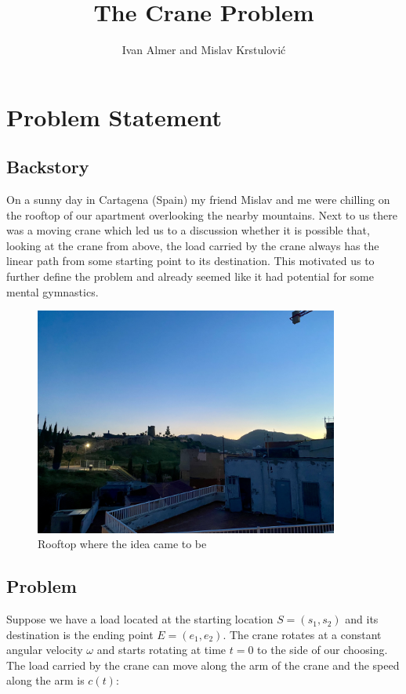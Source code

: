 \documentclass[11pt]{article}
\begin{document}
\title{The Crane Problem}
\author{Ivan Almer and Mislav Krstulović}

\maketitle

\section{Problem Statement}

\subsection{Backstory}
On a sunny day in Cartagena (Spain) my friend Mislav and me were chilling on the rooftop of our apartment overlooking the nearby mountains. Next to us there was a moving crane which led us to a discussion whether it is possible that, looking at the crane from above, the load carried by the crane always has the linear path from some starting point to its destination.
This motivated us to further define the problem and already seemed like it had potential for some mental gymnastics. 

\begin{figure}[H]
\centering
\includegraphics[width=10cm]{rooftop.jpeg}
\caption{Rooftop where the idea came to be}\label{rooftop}
\end{figure}

\subsection{Problem}
Suppose we have a load located at the starting location $S = (s_1,s_2)$ and its destination is the ending point $E = (e_1,e_2)$. The crane rotates at a constant angular velocity $\omega$ and starts rotating at time $t=0$ to the side of our choosing. The load carried by the crane can move along the arm of the crane and the speed along the arm is $c(t)$:
\end{document}

